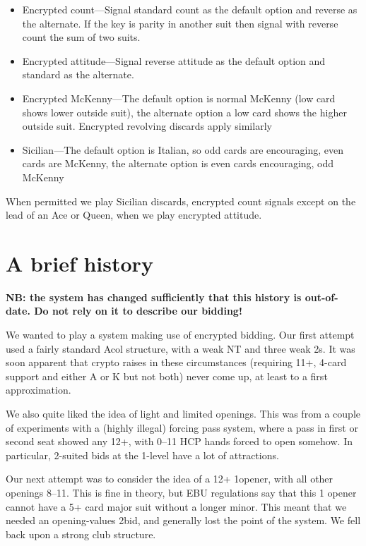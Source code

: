 \documentclass[a4paper,14pt]{extarticle}
\begin{document}
\begin{itemize}

\item Encrypted count---Signal standard count as the default option and reverse as the
alternate. If the key is parity in another suit then signal with reverse count
the sum of two suits.

\item Encrypted attitude---Signal reverse attitude as the default option and standard as
the alternate.

\item Encrypted McKenny---The default option is normal McKenny (low card shows lower
outside suit), the alternate option a low card shows the higher outside suit. Encrypted
revolving discards apply similarly

\item Sicilian---The default option is Italian, so odd cards are encouraging,
even cards are McKenny, the alternate option is even cards encouraging, odd
McKenny 

\end{itemize}

When permitted we play Sicilian discards, encrypted count signals except on the
lead of an Ace or Queen, when we play encrypted attitude.

\newpage

\section{A brief history}
\label{sec:history}

{\bf NB: the system has changed sufficiently that this history is out-of-date.  Do
not rely on it to describe our bidding! }

We wanted to play a system making use of encrypted bidding.  Our first attempt
used a fairly standard Acol structure, with a weak NT and three weak 2s.  It
was soon apparent that crypto raises in these circumstances (requiring 11+,
4-card support and either A or K but not both) never come up, at least to a
first approximation.

We also quite liked the idea of light and limited openings.  This was from a
couple of experiments with a (highly illegal) forcing pass system, where a pass
in first or second seat showed any 12+, with 0--11 HCP hands forced to open
somehow.  In particular, 2-suited bids at the 1-level have a lot of
attractions.

Our next attempt was to consider the idea of a 12+ 1\clubs opener, with all other
openings 8--11.  This is fine in theory, but EBU regulations say that this 1\clubs
opener cannot have a 5+ card major suit without a longer minor.  This meant
that we needed an opening-values 2\clubs bid, and generally lost the point of the
system.  We fell back upon a strong club structure.
\end{document}
